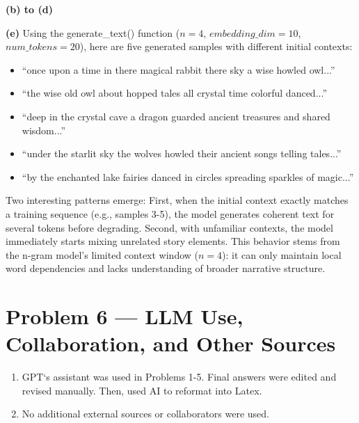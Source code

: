 \documentclass[11pt]{article}
\begin{document}
\noindent\textbf{(b) to (d)} 

\noindent\textbf{(e)} \quad Using the generate\_text() function ($n=4$, $embedding\_dim = 10$, $num\_tokens = 20$), here are five generated samples with different initial contexts:

\begin{itemize}
\item ``once upon a time in there magical rabbit there sky a wise howled owl...''
\item ``the wise old owl about hopped tales all crystal time colorful danced...''
\item ``deep in the crystal cave a dragon guarded ancient treasures and shared wisdom...''
\item ``under the starlit sky the wolves howled their ancient songs telling tales...''
\item ``by the enchanted lake fairies danced in circles spreading sparkles of magic...''
\end{itemize}

Two interesting patterns emerge: First, when the initial context exactly matches a training sequence (e.g., samples 3-5), the model generates coherent text for several tokens before degrading. Second, with unfamiliar contexts, the model immediately starts mixing unrelated story elements. This behavior stems from the n-gram model's limited context window ($n=4$): it can only maintain local word dependencies and lacks understanding of broader narrative structure.

\section*{Problem 6 --- LLM Use, Collaboration, and Other Sources}

\begin{enumerate}
\item GPT‘s assistant was used in Problems 1-5. Final answers were edited and revised manually. Then, used AI to reformat into Latex.
\item No additional external sources or collaborators were used.
\end{enumerate}
\end{document}
